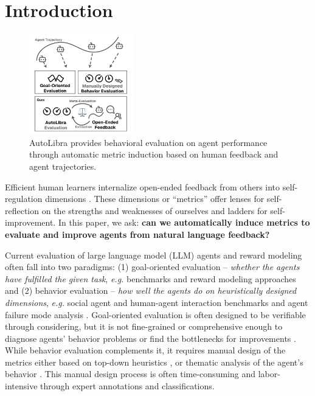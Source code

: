 \section{Introduction}

\begin{figure}
   \vspace{-44pt}
   \centering
   \includegraphics[width=0.4\textwidth]{figs/autolibra.pdf}
   \vspace{-10pt}
   \caption{AutoLibra provides behavioral evaluation on agent performance
    through automatic metric induction based on human feedback and agent trajectories.}
\end{figure}


Efficient human learners internalize open-ended feedback from others into self-regulation dimensions %
\citep{pintrich2002development,nicol2006formative}.
These dimensions or ``metrics'' offer lenses for self-reflection on the
strengths and weaknesses of ourselves and ladders for self-improvement.
In this paper, we ask:
\textbf{can we automatically induce metrics to evaluate and improve agents from natural language feedback?} 

   
Current evaluation of large language model (LLM) agents and reward modeling often fall
into two paradigms: (1) goal-oriented evaluation --
\emph{whether the agents have fulfilled the given task},
\emph{e.g.} benchmarks \citep{zhouwebarena,jimenezswe,chan2024mle,paglieri2024balrog} and reward
modeling approaches \citep{pan2024autonomous,chen2025scaling,choudhury2025process}
and (2) behavior evaluation -- \emph{how well the agents do on heuristically designed dimensions},
\emph{e.g.} social agent and human-agent interaction benchmarks \citep{zhousotopia,shao2024collaborative}
and agent failure mode analysis \citep{pan2025why,zhang2023effects,yang2023behavioral}. 
Goal-oriented evaluation is often designed to be verifiable through considering, but it is not fine-grained
or comprehensive enough to diagnose agents' behavior problems or find the bottlenecks for improvements \citep{yehudai2025survey}.  
While behavior evaluation complements it, it requires manual design of the metrics either based on top-down heuristics
\citep{zhousotopia}, or thematic analysis of the agent's behavior \citep{shao2024collaborative,pan2025why}.
This manual design process is often time-consuming and labor-intensive through expert annotations and classifications. 

